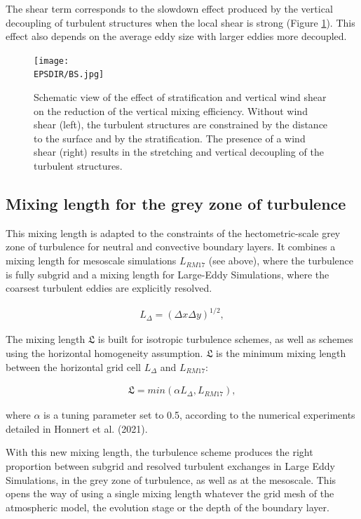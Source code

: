The shear term corresponds to the slowdown effect produced by the vertical decoupling of turbulent structures when the local shear is strong (Figure \ref{fig:shear}). This effect also depends on the average eddy size with larger eddies more decoupled.

\begin{figure}[!ht]
\centering
\noindent\texttt{[image: \\EPSDIR/BS.jpg]}
\caption{Schematic view of the effect of stratification and vertical wind shear on the reduction of the vertical mixing efficiency. Without wind shear (left), the turbulent structures are constrained by the distance to the surface and by the stratification. The presence of a wind shear (right) results in the stretching and vertical decoupling of the turbulent structures.}
\label{fig:shear}
\end{figure}

\subsection{Mixing length for the grey zone of turbulence}

This mixing length is adapted to the constraints of the hectometric-scale grey zone of turbulence for neutral and convective boundary layers. 
It combines a mixing length for mesoscale simulations $L_{RM17}$ (see above), where the turbulence is fully subgrid and a mixing length for Large-Eddy Simulations, where the coarsest turbulent eddies are explicitly resolved.
 
\begin{eqnarray}
	L_{\Delta}=(\Delta x \Delta y)^{1/2},
\end{eqnarray}

The mixing length $\mathfrak{L}$ is built for isotropic turbulence schemes, as well as schemes using the horizontal homogeneity assumption. $\mathfrak{L}$ is the minimum mixing length between the horizontal grid cell $L_{\Delta}$ and $L_{RM17}$: 

\begin{eqnarray}
	\mathfrak{L}=min(\alpha L_{\Delta}, L_{RM17}),
	\label{Eq1}
\end{eqnarray}

where $\alpha$ is a tuning parameter set to 0.5, according to the numerical experiments detailed in Honnert et al. (2021).

With this new mixing length, the turbulence scheme produces the right proportion between subgrid and resolved turbulent exchanges in Large Eddy Simulations, in the grey zone of turbulence, as well as at the mesoscale. This opens the way of using a single mixing length whatever the grid mesh of the atmospheric model, the evolution stage or the depth of the boundary layer.


